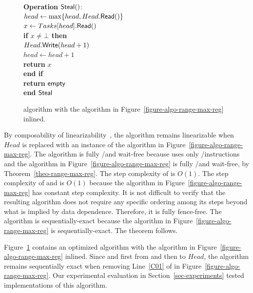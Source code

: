 \begin{figure}[H]
{{\begin{minipage}[t]{150mm}
\begin{tabbing}
          {\bf Operation} \({\sf Steal}()\): \\
           \> \> \(head \leftarrow \max\{head, Head.{\sf Read}()\}\)\\
           \> \> \(x \leftarrow Tasks[head].{\sf Read}()\) \\
           \> \> {\bf if \(x \neq \bot\) then}\\
           \> \> \> \(Head.{\sf Write}(head+1)\)\\
           \> \> \> \(head \leftarrow head+1\)\\
           \> \> \> {\bf return} \(x\)\\
           \> \> {\bf end if}\\
           \> \> {\bf return} ${\sf empty}$\\
          {\bf end} ${\sf Steal}$

        \end{tabbing}
      \end{minipage} }
    \caption{\label{figure-w-mult}\NCWSM algorithm with the \RangeMaxReg
      algorithm in Figure~\ref{figure-algo-range-max-reg} inlined.}
  }
\end{figure}

\begin{proofT}
By composability of linearizability~\cite{DBLP_journals_toplas_HerlihyW90}, the algorithm remains linearizable when \(Head\) is replaced with an instance of the algorithm in Figure~\ref{figure-algo-range-max-reg}. The algorithm is fully \R/\W and wait-free because \Put uses only \R/\W instructions and the \RangeMaxReg algorithm in Figure~\ref{figure-algo-range-max-reg} is fully \R/\W and wait-free, by Theorem~\ref{theo-range-max-reg}. The step complexity of \Put is $O(1)$. The step complexity of \Take and \Steal is $O(1)$ because the \RangeMaxReg algorithm in Figure~\ref{figure-algo-range-max-reg} has constant step complexity. It is not difficult to verify that the resulting algorithm does not require any specific ordering among its steps beyond what is implied by data dependence. Therefore, it is fully fence-free. The algorithm is sequentially-exact because the algorithm in Figure~\ref{figure-algo-range-max-reg} is sequentially-exact. The theorem follows.
\end{proofT}

Figure~\ref{figure-w-mult} contains an optimized \NCWSM algorithm with the \RangeMaxReg algorithm in Figure~\ref{figure-algo-range-max-reg} inlined. Since \Take and \Steal first \RMaxR from and then \RMaxW to \(Head\), the algorithm remains sequentially exact when removing Line~\ref{C01} of \RMaxW in Figure~\ref{figure-algo-range-max-reg}. Our experimental evaluation in Section~\ref{sec-experiments} tested implementations of this algorithm.

